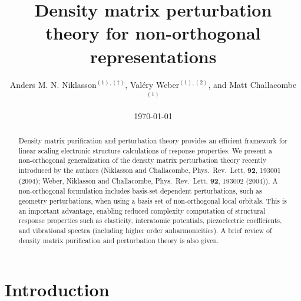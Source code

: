 \documentclass[twocolumn,showpacs,preprintnumbers,amsmath,amssymb]{revtex4}
\begin{document}

\title{Density matrix perturbation theory for non-orthogonal representations}

\author{Anders M. N. Niklasson$^{(1),(\dagger)}$, Val\'ery Weber$^{(1),(2)}$, and Matt Challacombe$^{(1)}$}


\date{\today}

\begin{abstract}
Density matrix purification and perturbation theory provides an efficient
framework for linear scaling electronic structure calculations of response properties. 
We present a non-orthogonal generalization of the density matrix perturbation theory 
recently introduced by the authors (Niklasson and Challacombe, Phys.\ Rev.\ Lett.  
{\bf 92}, 193001 (2004); Weber, Niklasson and Challacombe, Phys.\ Rev.\ Lett.  
{\bf 92}, 193002 (2004)).  A non-orthogonal formulation includes basis-set 
dependent perturbations, such as geometry perturbations, when using a basis 
set of non-orthogonal local orbitals.  This is an important advantage, 
enabling reduced complexity computation of structural response properties 
such as elasticity, interatomic potentials, piezoelectric coefficients, and vibrational 
spectra (including higher order anharmonicities). A brief review of density matrix
purification and perturbation theory is also given.
\end{abstract}

\maketitle

\section{Introduction}
\end{document}
